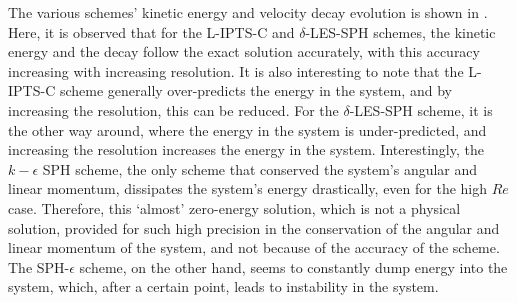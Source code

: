 The various schemes' kinetic energy and velocity decay evolution is shown in . 
Here, it is observed that for the L-IPTS-C and $\delta$-LES-SPH schemes, the kinetic energy and the decay follow the exact solution accurately, with this accuracy increasing with increasing resolution. It is also interesting to note that the L-IPTS-C scheme generally over-predicts the energy in the system, and by increasing the resolution, this can be reduced. For the $\delta$-LES-SPH scheme, it is the other way around, where the energy in the system is under-predicted, and increasing the resolution increases the energy in the system.
Interestingly, the $k-\epsilon$ SPH scheme, the only scheme that conserved the system's angular and linear momentum, dissipates the system's energy drastically, even for the high $Re$ case. Therefore, this `almost' zero-energy solution, which is not a physical solution, provided for such high precision in the conservation of the angular and linear momentum of the system, and not because of the accuracy of the scheme.
The SPH-$\epsilon$ scheme, on the other hand, seems to constantly dump energy into the system, which, after a certain point, leads to instability in the system.

